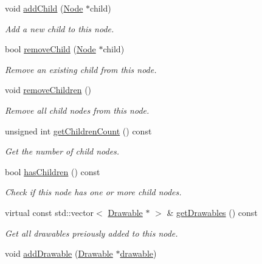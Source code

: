 \begin{DoxyCompactItemize}
void \mbox{\hyperlink{classec_1_1_node_a647bcdef4e01de3ecb34e0917ba9e333}{add\+Child}} (\mbox{\hyperlink{classec_1_1_node}{Node}} $\ast$child)
\begin{DoxyCompactList}\small\item\em Add a new child to this node. \end{DoxyCompactList}\item 
bool \mbox{\hyperlink{classec_1_1_node_ab0d856da4064db916e6fd4f9ad1ecafb}{remove\+Child}} (\mbox{\hyperlink{classec_1_1_node}{Node}} $\ast$child)
\begin{DoxyCompactList}\small\item\em Remove an existing child from this node. \end{DoxyCompactList}\item 
void \mbox{\hyperlink{classec_1_1_node_a4d9f13d7482fe4612ec2cffa8a06cc00}{remove\+Children}} ()
\begin{DoxyCompactList}\small\item\em Remove all child nodes from this node. \end{DoxyCompactList}\item 
unsigned int \mbox{\hyperlink{classec_1_1_node_a3fb0342e532d42984870f598ec4d0ba3}{get\+Children\+Count}} () const
\begin{DoxyCompactList}\small\item\em Get the number of child nodes. \end{DoxyCompactList}\item 
bool \mbox{\hyperlink{classec_1_1_node_ae1626b695c7c5f15af399772b51d0a5a}{has\+Children}} () const
\begin{DoxyCompactList}\small\item\em Check if this node has one or more child nodes. \end{DoxyCompactList}\item 
virtual const std\+::vector$<$ \mbox{\hyperlink{classec_1_1_drawable}{Drawable}} $\ast$ $>$ \& \mbox{\hyperlink{classec_1_1_node_a2403cd39000eceffdec878133f621e3a}{get\+Drawables}} () const
\begin{DoxyCompactList}\small\item\em Get all drawables preiously added to this node. \end{DoxyCompactList}\item 
void \mbox{\hyperlink{classec_1_1_node_aef615bcf1c24225838e00c15d03dc707}{add\+Drawable}} (\mbox{\hyperlink{classec_1_1_drawable}{Drawable}} $\ast$\mbox{\hyperlink{_resource_type_8h_a0e08bf97f986b1083a00d3f004fb04f7}{drawable}})

\end{DoxyCompactItemize}
